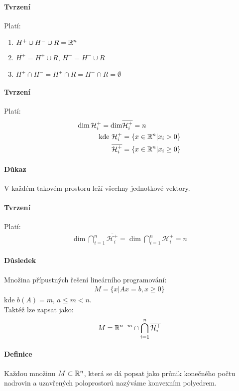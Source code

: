 \documentclass[a4paper,12pt,titlepage]{article}
\begin{document}
\paragraph{Tvrzení}
Platí:
\begin{enumerate}
	\item $H^+ \cup H^- \cup R = \mathbb{R}^n$
	\item $\overline{H^+} = H^+ \cup R$, $\overline{H^-} = H^- \cup R$
	\item $H^+ \cap H^- = H^+ \cap R = H^- \cap R = \emptyset$
\end{enumerate}
\paragraph{Tvrzení}
Platí:
\begin{align}
	\dim \mathcal{H}_i^+ = \dim &\overline{\mathcal{H}_i^+} = n \\
	\text{kde } \mathcal{H}_i^+ &= \{ x \in \mathbb{R}^n | x_i > 0 \} \\
	\overline{\mathcal{H}_i^+} &= \{ x \in \mathbb{R}^n | x_i \ge 0 \}
\end{align}
\paragraph{Důkaz}
V každém takovém prostoru leží všechny jednotkové vektory.
\paragraph{Tvrzení}
Platí:
\begin{align}
	\dim \bigcap_{i=1}^n \overline{\mathcal{H}_i^+} = \dim \bigcap_{i=1}^n
	\mathcal{H}_i^+ = n
\end{align}
\paragraph{Důsledek}
Množina přípustných řešení lineárního programování:
\begin{align}
M = \{ x | Ax = b, x \ge 0 \}
\end{align}
kde $b(A) = m$, $a \le m < n$. \\
Taktéž lze zapsat jako:
\begin{align}
	M = \mathbb{R}^{n-m} \cap	\bigcap_{i=1}^n \overline{\mathcal{H}_i^+}
\end{align}
\paragraph{Definice}
Každou množinu $M \subset \mathbb{R}^n$, která se dá popsat jako průnik konečného počtu
nadrovin a uzavřených poloprostorů nazýváme konvexním polyedrem.
\end{document}
